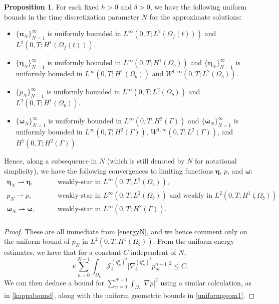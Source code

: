 \documentclass[11pt]{article}
\newcommand{\bd}{\boldsymbol}
\theoremstyle{definition}
\newtheorem{proposition}{Proposition}[section]
\begin{document}
\begin{proposition}\label{uniformenergy}
For each fixed $h > 0$ and $\delta > 0$, we have the following uniform bounds in the time discretization parameter $N$ for the approximate solutions:
\begin{itemize}
\item $\{\bd{u}_{N}\}_{N = 1}^{\infty}$ is uniformly bounded in $L^{\infty}(0, T; L^{2}(\Omega_{f}(t)))$ and $L^{2}(0, T; H^{1}(\Omega_{f}(t)))$. 
\item $\{\bd{\eta}_{N}\}_{N = 1}^{\infty}$ is uniformly bounded in $L^{\infty}(0, T; H^{1}(\Omega_{b}))$ and $\{\overline{\bd{\eta}}_{N}\}_{N = 1}^{\infty}$ is uniformly bounded in $L^{\infty}(0, T; H^{1}(\Omega_{b}))$ and $W^{1, \infty}(0, T; L^{2}(\Omega_{b}))$. 
\item $\{p_{N}\}_{N = 1}^{\infty}$ is uniformly bounded in $L^{\infty}(0, T; L^{2}(\Omega_{b}))$ and $L^{2}(0, T; H^{1}(\Omega_{b}))$. 
\item $\{\bd{\omega}_{N}\}_{N = 1}^{\infty}$ is uniformly bounded in $L^{\infty}(0, T; H^{2}(\Gamma))$ and $\{\overline{\bd{\omega}}_{N}\}_{N = 1}^{\infty}$ is uniformly bounded in $L^{\infty}(0, T; H^{2}(\Gamma))$, $W^{1, \infty}(0, T; L^{2}(\Gamma))$, and $H^{1}(0, T; H^{2}(\Gamma))$. 
\end{itemize}
Hence, along a subsequence in $N$ (which is still denoted by $N$ for notational simplicity), we have the following convergences to limiting functions $\bd{\eta}$, $p$, and $\bd{\omega}$:
\begin{align*}
\bd{\eta}_{N} \rightharpoonup \bd{\eta}, \qquad &\text{ weakly-star in $L^{\infty}(0, T; L^{2}(\Omega_{b}))$}, \\
p_{N} \rightharpoonup p, \qquad &\text{ weakly-star in $L^{\infty}(0, T; L^{2}(\Omega_{b}))$ and weakly in $L^{2}(0, T; H^{1}(\Omega_{b}))$}, \\
\bd{\omega}_{N} \rightharpoonup \bd{\omega}, \qquad &\text{ weakly-star in $L^{\infty}(0, T; H^{2}(\Gamma))$}. \\
\end{align*}
\end{proposition}

\begin{proof}
These are all immediate from \eqref{energyN}, and we hence comment only on the uniform bound of $p_{N}$ in $L^{2}(0, T; H^{1}(\Omega_{b}))$. From the uniform energy estimates, we have that for a constant $C$ independent of $N$,
\begin{equation*}
\kappa \sum_{n = 0}^{N - 1} \int_{\Omega_{b}} \mathcal{J}^{(\eta^{n}_{N})^{\delta}}_{b} \Big|\nabla^{(\eta^{n}_{N})^{\delta}}_{b} p^{n + 1}_{N}\Big|^{2} \le C.
\end{equation*}
We can then deduce a bound for $\displaystyle \sum_{n = 0}^{N - 1} \int_{\Omega_{b}} |\nabla p|^{2}$ using a similar calculation, as in \eqref{kappabound}, along with the uniform geometric bounds in \eqref{uniformgeom1}.
\end{proof}
\end{document}
